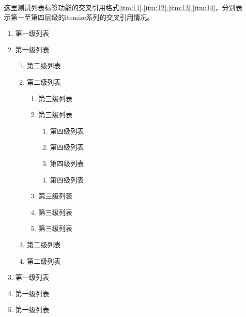这里测试列表标签功能的交叉引用格式\ref{itm:11},\ref{itm:12},\ref{itm:13},\ref{itm:14}，分别表示第一至第四层级的itemize系列的交叉引用情况。
\begin{enumerate}
	\item 第一级列表\label{itm:11}
	\item 第一级列表
	\begin{enumerate}
		\item 第二级列表\label{itm:12}
		\item 第二级列表
		\begin{enumerate}
			\item 第三级列表\label{itm:13}
			\item 第三级列表
			\begin{enumerate}
				\item 第四级列表\label{itm:14}
				\item 第四级列表
				\item 第四级列表
				\item 第四级列表
			\end{enumerate}
			\item 第三级列表
			\item 第三级列表
			\item 第三级列表
		\end{enumerate}
		\item 第二级列表
		\item 第二级列表
	\end{enumerate}
	\item 第一级列表
	\item 第一级列表
	\item 第一级列表
\end{enumerate}

